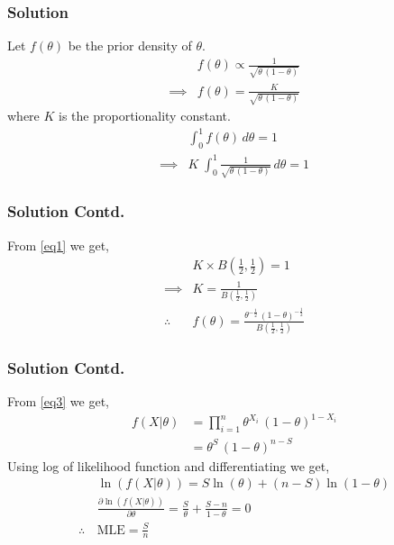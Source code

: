 \documentclass{beamer}
\providecommand{\brak}[1]{\ensuremath{\left(#1\right)}}
\begin{document}
\begin{frame}
\frametitle{Solution}
    Let $f\brak{\theta}$ be the prior density of $\theta$.
    \begin{align}
        &f\brak{\theta} \propto \frac{1}{\sqrt{\theta\,\brak{1-\theta}}}\nonumber\\
        \implies &f\brak{\theta} = \frac{K}{\sqrt{\theta\,\brak{1-\theta}}}
    \end{align}
    where $K$ is the proportionality constant.
    \begin{align}
        &\int_0^1 f\brak{\theta}\,d\theta = 1\nonumber\\
        \implies &K\;\int_0^1 \frac{1}{\sqrt{\theta\,\brak{1-\theta}}}\,d\theta =1
    \end{align}
   
\end{frame}

\begin{frame}
 \frametitle{Solution Contd.}
      From \eqref{eq1} we get,
    \begin{align}
        &K\times B\brak{\frac{1}{2},\frac{1}{2}} = 1\nonumber\\
        \implies &K = \frac{1}{B\brak{\frac{1}{2},\frac{1}{2}}}\\
        \therefore\, &f\brak{\theta} =             \frac{\theta^{-\frac{1}{2}}\,\brak{1-\theta}^{-\frac{1}{2}}}{B\brak{\frac{1}{2},\frac{1}{2}}}\label{eq7}
    \end{align}
\end{frame}

\begin{frame}
  \frametitle{Solution Contd.} 
  From \eqref{eq3} we get,
    \begin{align}
    f\brak{X|\theta} &= \prod_{i=1}^n\theta^{X_i}\,\brak{1-\theta}^{1-X_i}\nonumber\\
    &=\theta^S\,\brak{1-\theta}^{n-S}\label{eq8}
    \end{align}
    Using log of likelihood function and differentiating we get,
\begin{align}
    &\ln\brak{{f\brak{X|\theta}}} = S\ln\brak{{\theta}} + \brak{n-S}\ln\brak{{1-\theta}}\\
    &\frac{\partial \ln\brak{{f\brak{X|\theta}}}}{\partial \theta} = \frac{S}{\theta} + \frac{S-n}{1-\theta} = 0 \nonumber\\
     \therefore\, &\text{MLE} = \frac{S}{n}
\end{align}
\end{frame}
\end{document}
